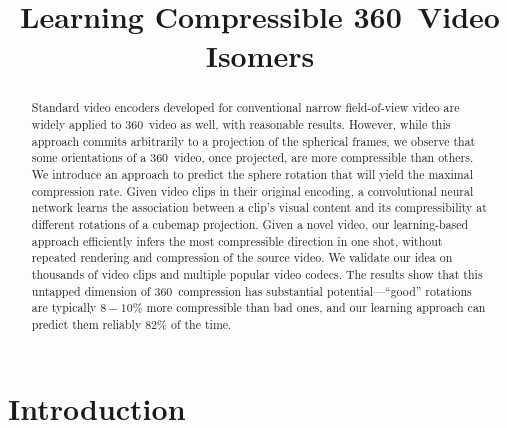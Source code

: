 \documentclass[journal,transmag]{IEEEtran}
\begin{document}
\title{Learning Compressible 360\textdegree~Video Isomers}

\author{
}
















\maketitle

\begin{abstract}
Standard video encoders developed for conventional narrow field-of-view video are widely applied to $360$\textdegree~video as well, with reasonable results.
However, while this approach commits arbitrarily to a projection of the spherical frames, we observe that some orientations of a $360$\textdegree~video, once projected, are more compressible than others.
We introduce an approach to predict the sphere rotation that will yield the maximal compression rate.
Given video clips in their original encoding, a convolutional neural network learns the association between a clip's visual content and its compressibility at different rotations of a cubemap projection.
Given a novel video,
our learning-based approach efficiently infers the most compressible direction in one shot,
without repeated rendering and compression of the source video.
We validate our idea on thousands of video clips and multiple popular video codecs.
The results show that this untapped dimension of $360$\textdegree~compression has substantial potential---``good'' rotations are typically $8{-}10\%$ more compressible than bad ones,
and our learning approach can predict them reliably $82\%$ of the time.
\end{abstract}



\section{Introduction}
\end{document}
